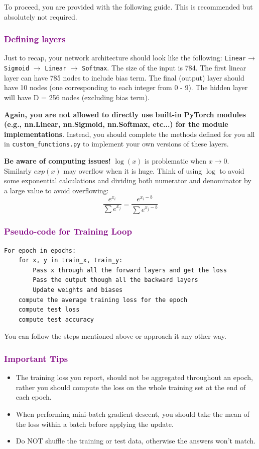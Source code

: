 To proceed, you are provided with the following guide. This is recommended but absolutely not required.

\subsubsection*{\textcolor{purple}{Defining layers}}

Just to recap, your network architecture should look like the following:
 \texttt{Linear}$\rightarrow$ \texttt{Sigmoid} $\rightarrow$ \texttt{Linear} $\rightarrow$ \texttt{Softmax}.
 The size of the input is 784. The first linear layer can have 785 nodes to include bias term. The final (output) layer should have 10 nodes (one corresponding to each integer from 0 - 9). The hidden layer will have D = 256 nodes (excluding bias term).


\textbf{Again, you are not allowed to directly use built-in PyTorch modules (e.g.,
nn.Linear, nn.Sigmoid, nn.Softmax, etc...) for the module implementations}. Instead,
you should complete the methods defined for you all in \texttt{custom\_functions.py} to
implement your own versions of these layers.
    
\textbf{Be aware of computing issues!} $\log(x)$ is problematic when $x\rightarrow0$. Similarly $exp(x)$ may overflow
when it is huge. Think of using $\log$ to avoid some exponential calculations and dividing both numerator and denominator by a large value to avoid overflowing:
$$\frac{e^{x_i}}{\sum e^{x_j}} = \frac{e^{x_i-b}}{\sum e^{x_j-b}}$$


\subsubsection*{\textcolor{purple}{Pseudo-code for Training Loop}}
\begin{lstlisting}
For epoch in epochs:
	for x, y in train_x, train_y:
		Pass x through all the forward layers and get the loss
		Pass the output though all the backward layers
		Update weights and biases
	compute the average training loss for the epoch
	compute test loss
	compute test accuracy
\end{lstlisting}

You can follow the steps mentioned above or approach it any other way. 

\subsubsection*{\textcolor{purple}{Important Tips}}
\begin{itemize}
    \item The training loss you report, should not be aggregated throughout an epoch, rather you should compute the loss on the whole training set at the end of each epoch.
   
    \item When performing mini-batch gradient descent, you should take the mean of the loss within a batch before applying the update.
    \item Do NOT shuffle the training or test data, otherwise the answers won't match. 
\end{itemize}

